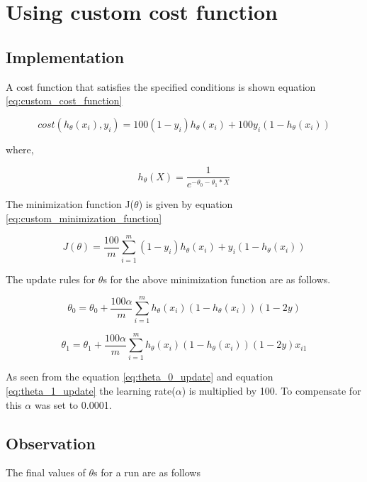 \section{Using custom cost function}

\subsection{Implementation}
A cost function that satisfies the specified conditions is shown equation \ref{eq:custom_cost_function}

\begin{equation}
\label{eq:custom_cost_function}
cost(h_{\theta}(x_i), y_i) = 100(1-y_i)h_{\theta}(x_i) + 100y_i(1-h_{\theta}(x_i))
\end{equation}

where,

\begin{equation}
\label{eq:logistic_regression}
h_{\theta}(X) = \frac{1}{e^{-\theta_0 - \theta_1 * X}}
\end{equation}

The minimization function J($\theta$) is given by equation \ref{eq:custom_minimization_function}

\begin{equation}
\label{eq:custom_minimization_function}
J(\theta) = \frac{100}{m} \sum_{i=1}^{m}(1-y_i)h_{\theta}(x_i) + y_i(1-h_{\theta}(x_i))
\end{equation}

The update rules for $\theta$s for the above minimization function are as follows.

\begin{equation}
\label{eq:theta_0_update}
\theta_0 = \theta_0 + \frac{100\alpha}{m}\sum_{i=1}^{m}h_\theta(x_i)(1-h_\theta(x_i))(1-2y)
\end{equation}

\begin{equation}
\label{eq:theta_1_update}
\theta_1 = \theta_1 + \frac{100\alpha}{m}\sum_{i=1}^{m}h_\theta(x_i)(1-h_\theta(x_i))(1-2y)x_{i1}
\end{equation}

As seen from the equation \ref{eq:theta_0_update} and equation \ref{eq:theta_1_update} the learning rate($\alpha$)
is multiplied by 100. To compensate for this $\alpha$ was set to 0.0001.

\subsection{Observation}
The final values of $\theta$s for a run are as follows

